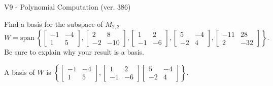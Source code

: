 \begin{exercise}
  \begin{exerciseTitle}V9 - Polynomial Computation (ver. 386)\end{exerciseTitle}
  \begin{exerciseStatement}
    Find a basis for the subspace of \(M_{2,2}\) 
\[W=\mathrm{span}\ \left\{\left[\begin{array}{cc}
-1 & -4 \\
1 & 5
\end{array}\right] , \left[\begin{array}{cc}
2 & 8 \\
-2 & -10
\end{array}\right] , \left[\begin{array}{cc}
1 & 2 \\
-1 & -6
\end{array}\right] , \left[\begin{array}{cc}
5 & -4 \\
-2 & 4
\end{array}\right] , \left[\begin{array}{cc}
-11 & 28 \\
2 & -32
\end{array}\right]\right\}.\]
 Be sure to explain why your result is a basis.


  \end{exerciseStatement}
  \begin{exerciseAnswer}
   A basis of \(W\) is  \(\left\{\left[\begin{array}{cc}
-1 & -4 \\
1 & 5
\end{array}\right] , \left[\begin{array}{cc}
1 & 2 \\
-1 & -6
\end{array}\right] \left[\begin{array}{cc}
5 & -4 \\
-2 & 4
\end{array}\right]\right\}\).
  


  \end{exerciseAnswer}
\end{exercise}